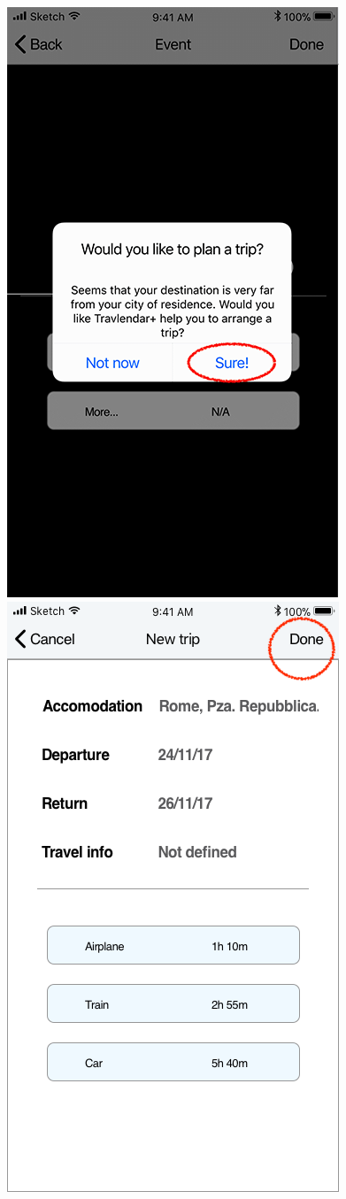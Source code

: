 \begin{figure}[H]
	\includegraphics[scale=0.23]{Images/Interface/Trips/2_trip_warning}
	\hspace{0.5cm}
	\includegraphics[scale=0.23]{Images/Interface/Trips/3_trip_not_defined}

\end{figure}
